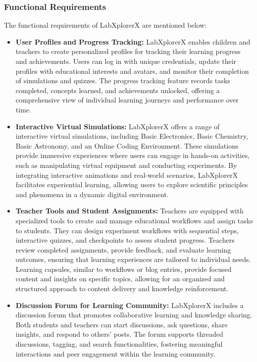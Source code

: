 \subsubsection{Functional Requirements}The functional requirements of LabXplorerX are mentioned below:
\begin{itemize}
    \item \textbf{User Profiles and Progress Tracking:} LabXplorerX enables children and teachers to create personalized profiles for tracking their learning progress and achievements. Users can log in with unique credentials, update their profiles with educational interests and avatars, and monitor their completion of simulations and quizzes. The progress tracking feature records tasks completed, concepts learned, and achievements unlocked, offering a comprehensive view of individual learning journeys and performance over time.

    \item \textbf{Interactive Virtual Simulations:} LabXplorerX offers a range of interactive virtual simulations, including Basic Electronics, Basic Chemistry, Basic Astronomy, and an Online Coding Environment. These simulations provide immersive experiences where users can engage in hands-on activities, such as manipulating virtual equipment and conducting experiments. By integrating interactive animations and real-world scenarios, LabXplorerX facilitates experiential learning, allowing users to explore scientific principles and phenomena in a dynamic digital environment.

    \item \textbf{Teacher Tools and Student Assignments:} Teachers are equipped with specialized tools to create and manage educational workflows and assign tasks to students. They can design experiment workflows with sequential steps, interactive quizzes, and checkpoints to assess student progress. Teachers review completed assignments, provide feedback, and evaluate learning outcomes, ensuring that learning experiences are tailored to individual needs. Learning capsules, similar to workflows or blog entries, provide focused content and insights on specific topics, allowing for an organized and structured approach to content delivery and knowledge reinforcement.

    \item \textbf{Discussion Forum for Learning Community:} LabXplorerX includes a discussion forum that promotes collaborative learning and knowledge sharing. Both students and teachers can start discussions, ask questions, share insights, and respond to others' posts. The forum supports threaded discussions, tagging, and search functionalities, fostering meaningful interactions and peer engagement within the learning community.


\end{itemize}
